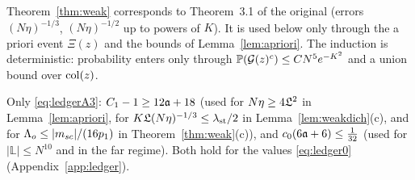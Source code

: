 \begin{remark}
Theorem~\ref{thm:weak} corresponds to Theorem~3.1 of the original (errors $(N\eta)^{-1/3}$, $(N\eta)^{-1/2}$ up to powers of $K$). It is used below only through the a priori event $\Xi(z)$ and the bounds of Lemma~\ref{lem:apriori}.
The induction is deterministic: probability enters only through $\mathbb{P}(\mathcal{G}(z)^c)\le CN^5e^{-K^2}$ and a union bound over ${\rm col}(z)$.
\end{remark}
\begin{remark}\label{rem:ledgerA3}
Only \eqref{eq:ledgerA3}: $C_1-1\ge12\mathfrak{a}+18$ (used for $N\eta\ge4\mathfrak{L}^2$ in Lemma~\ref{lem:apriori}, for $K\mathfrak{L}(N\eta)^{-1/3}\le\lambda_{\rm st}/2$ in Lemma~\ref{lem:weakdich}(c), and for $\Lambda_o\le|m_{sc}|/(16p_1)$ in Theorem~\ref{thm:weak}(c)), and $c_0(6\mathfrak{a}+6)\le\frac1{32}$
(used for $|\mathbb L|\le N^{10}$ and in the far regime). Both hold for the values \eqref{eq:ledger0} (Appendix~\ref{app:ledger}).
\end{remark}
